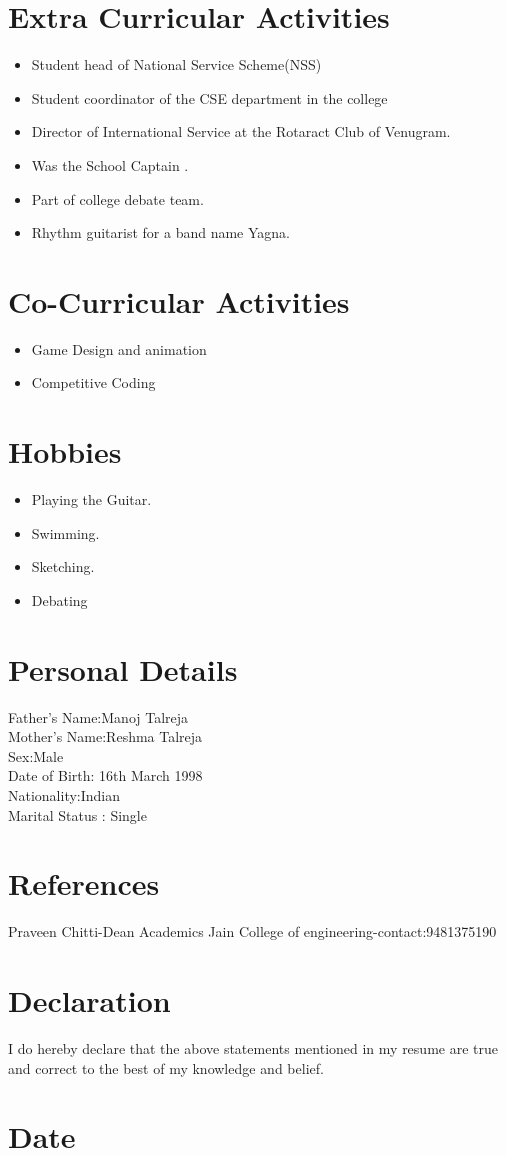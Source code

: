 \documentclass{article}
\begin{document}
		\section{Extra Curricular Activities}
			\begin{itemize}
				\item Student head of National Service Scheme(NSS)
				\item Student coordinator of the CSE department in the college
				\item Director of International Service at the Rotaract Club of Venugram.
				\item Was the School Captain .
				\item Part of college debate team.
				\item Rhythm guitarist for a band name Yagna.
			\end{itemize}
		\section{Co-Curricular Activities}
			\begin{itemize}
				\item Game Design and animation
				\item Competitive Coding 
			\end{itemize}
		\section{Hobbies}
			\begin{itemize}
				\item Playing the Guitar.
				\item Swimming.
				\item Sketching.
				\item Debating
			\end{itemize}
			\section{Personal Details}
				Father's Name:Manoj Talreja \\
				Mother's Name:Reshma Talreja\\
				Sex:Male\\
				Date of Birth: 16th March 1998\\ 	
				Nationality:Indian \\
				Marital Status : Single \\
			\section{References}
			Praveen Chitti-Dean Academics Jain College of engineering-contact:9481375190
			\section{Declaration}
				I do hereby declare that the above statements mentioned in my resume are true and correct to the best of my knowledge and belief.
			\section{Date}
				\date{17th April 2019}
\end{document}
